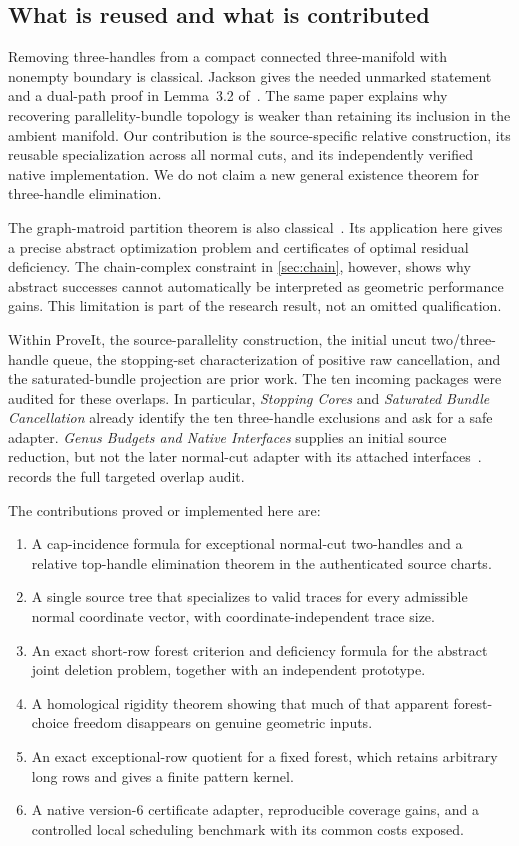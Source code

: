\subsection{What is reused and what is contributed}

Removing three-handles from a compact connected three-manifold with nonempty
boundary is classical. Jackson gives the needed unmarked statement and a
dual-path proof in Lemma~3.2 of~\cite{jackson2023}. The same paper explains
why recovering parallelity-bundle topology is weaker than retaining its
inclusion in the ambient manifold. Our contribution is the source-specific
relative construction, its reusable specialization across all normal cuts,
and its independently verified native implementation. We do not claim a new
general existence theorem for three-handle elimination.

The graph-matroid partition theorem is also classical~\cite{edmondsfulkerson}.
Its application here gives a precise abstract optimization problem and
certificates of optimal residual deficiency. The chain-complex constraint in
\cref{sec:chain}, however, shows why abstract successes cannot automatically
be interpreted as geometric performance gains. This limitation is part of
the research result, not an omitted qualification.

Within ProveIt, the source-parallelity construction, the initial uncut
two/three-handle queue, the stopping-set characterization of positive raw
cancellation, and the saturated-bundle projection are prior work. The ten
incoming packages were audited for these overlaps. In particular,
\emph{Stopping Cores} and \emph{Saturated Bundle Cancellation} already
identify the ten three-handle exclusions and ask for a safe adapter.
\emph{Genus Budgets and Native Interfaces} supplies an initial source
reduction, but not the later normal-cut adapter with its attached
interfaces~\cite{repo,incoming-stopping,incoming-saturated,incoming-genus}.
 records the full targeted overlap audit.

The contributions proved or implemented here are:
\begin{enumerate}
\item A cap-incidence formula for exceptional normal-cut two-handles and a
relative top-handle elimination theorem in the authenticated source charts.
\item A single source tree that specializes to valid traces for every
admissible normal coordinate vector, with coordinate-independent trace size.
\item An exact short-row forest criterion and deficiency formula for the
abstract joint deletion problem, together with an independent prototype.
\item A homological rigidity theorem showing that much of that apparent
forest-choice freedom disappears on genuine geometric inputs.
\item An exact exceptional-row quotient for a fixed forest, which retains
arbitrary long rows and gives a finite pattern kernel.
\item A native version-6 certificate adapter, reproducible coverage gains,
and a controlled local scheduling benchmark with its common costs exposed.
\end{enumerate}

